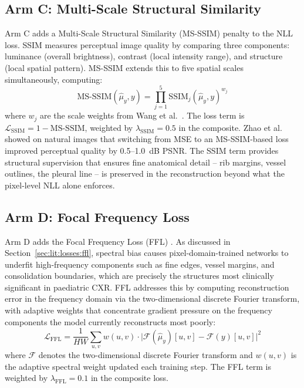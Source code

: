 \documentclass[12pt, a4paper, twoside, openright]{book}
\begin{document}
\subsection{Arm C: Multi-Scale Structural Similarity}
\label{sec:methods:loss:ssim}

Arm C adds a Multi-Scale Structural Similarity (MS-SSIM) penalty to the NLL loss. SSIM
\cite{wang_image_2004} measures perceptual image quality by comparing three
components: luminance (overall brightness), contrast (local intensity range), and structure
(local spatial pattern). MS-SSIM \cite{wang_multiscale_2003} extends this to five spatial
scales simultaneously, computing:
\begin{equation}
\label{eq:methods:ssim}
\mathrm{MS\text{-}SSIM}\!\left(\hat{\mu}_y, y\right)
  = \prod_{j=1}^{5} \mathrm{SSIM}_j\!\left(\hat{\mu}_y, y\right)^{w_j}
\end{equation}
where $w_j$ are the scale weights from Wang et al.\ \cite{wang_multiscale_2003}. The loss
term is $\mathcal{L}_{\mathrm{SSIM}} = 1 - \mathrm{MS\text{-}SSIM}$, weighted by
$\lambda_{\mathrm{SSIM}} = 0.5$ in the composite. Zhao et al.\ \cite{zhao_loss_2017}
showed on natural images that switching from MSE to an MS-SSIM-based loss improved
perceptual quality by 0.5--1.0~dB PSNR. The SSIM term provides structural supervision
that ensures fine anatomical detail -- rib margins, vessel outlines, the pleural line -- is
preserved in the reconstruction beyond what the pixel-level NLL alone enforces.

\subsection{Arm D: Focal Frequency Loss}
\label{sec:methods:loss:ffl}

Arm D adds the Focal Frequency Loss (FFL) \cite{jiang_focal_2021}. As discussed in
Section~\ref{sec:lit:losses:ffl}, spectral bias \cite{rahaman_spectral_2019} causes
pixel-domain-trained networks to underfit high-frequency components such as fine edges, vessel
margins, and consolidation boundaries, which are precisely the structures most clinically significant
in paediatric CXR. FFL addresses this by computing reconstruction error in the frequency
domain via the two-dimensional discrete Fourier transform, with adaptive weights that
concentrate gradient pressure on the frequency components the model currently reconstructs
most poorly:
\begin{equation}
\label{eq:methods:ffl}
\mathcal{L}_{\mathrm{FFL}} = \frac{1}{HW}\sum_{u,v}
  w(u,v) \cdot \bigl|\mathcal{F}(\hat{\mu}_y)[u,v] - \mathcal{F}(y)[u,v]\bigr|^2
\end{equation}
where $\mathcal{F}$ denotes the two-dimensional discrete Fourier transform and $w(u,v)$
is the adaptive spectral weight updated each training step. The FFL term is weighted by
$\lambda_{\mathrm{FFL}} = 0.1$ in the composite loss.
\end{document}
